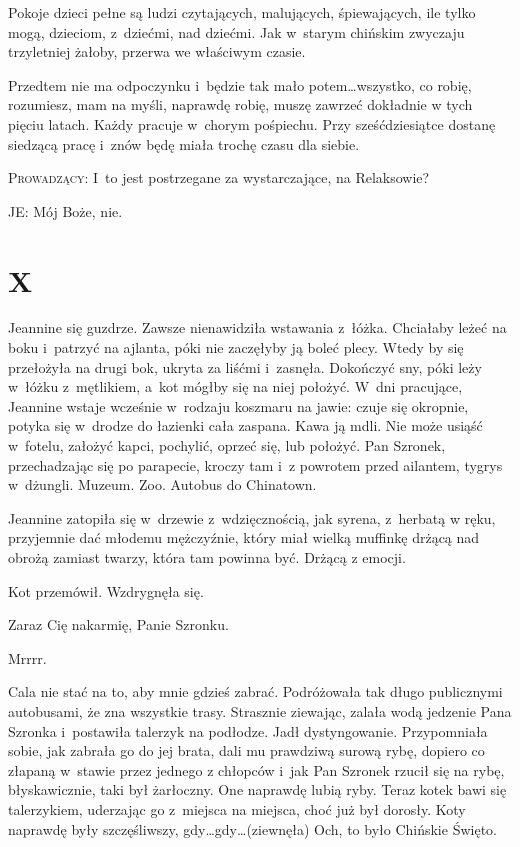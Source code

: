 \documentclass[oneside,polish,12pt,sfheadings]{mwbk}
\begin{document}
Pokoje dzieci pełne są ludzi czytających, malujących, śpiewających,
ile tylko mogą, dzieciom, z~dziećmi, nad dziećmi. Jak w~starym chińskim
zwyczaju trzyletniej żałoby, przerwa we właściwym czasie.

Przedtem nie ma odpoczynku i~będzie tak mało potem\ldots wszystko, co
robię, rozumiesz, mam na myśli, naprawdę robię, muszę zawrzeć dokładnie
w tych pięciu latach. Każdy pracuje w~chorym pośpiechu. Przy sześćdziesiątce
dostanę siedzącą pracę i~znów będę miała trochę czasu dla siebie.

\textsc{Prowadzący}: I~to jest postrzegane za wystarczające, na Relaksowie?

JE: Mój Boże, nie.

\chapter{X}

Jeannine się guzdrze. Zawsze nienawidziła wstawania z~łóżka. Chciałaby
leżeć na boku i~patrzyć na ajlanta, póki nie zaczęłyby ją boleć plecy.
Wtedy by się przełożyła na drugi bok, ukryta za liśćmi i~zasnęła.
Dokończyć sny, póki leży w~łóżku z~mętlikiem, a~kot mógłby się na
niej położyć. W~dni pracujące, Jeannine wstaje wcześnie w~rodzaju
koszmaru na jawie: czuje się okropnie, potyka się w~drodze do łazienki
cała zaspana. Kawa ją mdli. Nie może usiąść w~fotelu, założyć kapci,
pochylić, oprzeć się, lub położyć. Pan Szronek, przechadzając się po parapecie, kroczy tam i~z powrotem przed ailantem, tygrys w~dżungli. Muzeum. Zoo. Autobus do Chinatown.

Jeannine zatopiła się w~drzewie z~wdzięcznością, jak syrena, z~herbatą
w ręku, przyjemnie dać młodemu mężczyźnie, który miał wielką muffinkę
drżącą nad obrożą zamiast twarzy, która tam powinna być. Drżącą z
emocji.

Kot przemówił. Wzdrygnęła się. 

Zaraz Cię nakarmię, Panie Szronku.

Mrrrr.

Cala nie stać na to, aby mnie gdzieś zabrać. Podróżowała tak długo
publicznymi autobusami, że zna wszystkie trasy. Strasznie ziewając,
zalała wodą jedzenie Pana Szronka i~postawiła talerzyk na podłodze.
Jadł dystyngowanie. Przypomniała sobie, jak zabrała go do jej brata,
dali mu prawdziwą surową rybę, dopiero co złapaną w~stawie przez jednego
z chłopców i~jak Pan Szronek rzucił się na rybę, błyskawicznie, taki
był żarłoczny. One naprawdę lubią ryby. Teraz kotek bawi się talerzykiem,
uderzając go z~miejsca na miejsca, choć już był dorosły. Koty naprawdę
były szczęśliwszy, gdy\ldots gdy\ldots (ziewnęła) Och, to było Chińskie
Święto.
\end{document}
